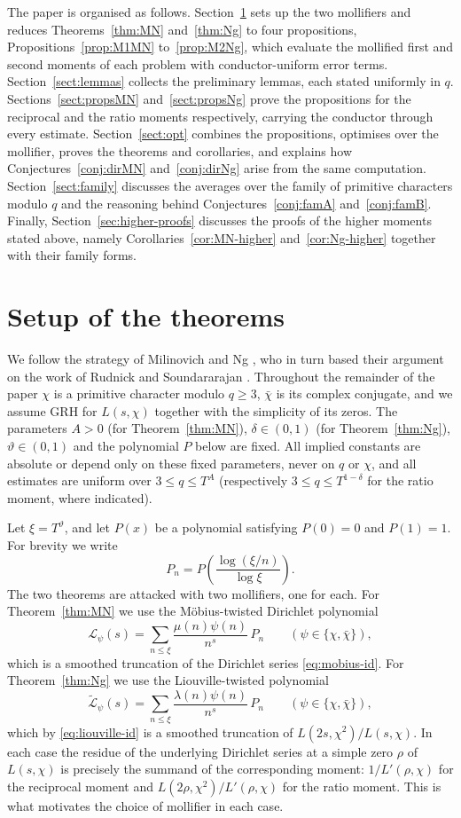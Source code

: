\documentclass[12pt,a4paper,reqno]{amsart}
\theoremstyle{remark}
\numberwithin{equation}{section}
\begin{document}
The paper is organised as follows. Section~\ref{sect:setup} sets up the two mollifiers and reduces Theorems~\ref{thm:MN} and~\ref{thm:Ng} to four propositions, Propositions~\ref{prop:M1MN} to~\ref{prop:M2Ng}, which evaluate the mollified first and second moments of each problem with conductor-uniform error terms. Section~\ref{sect:lemmas} collects the preliminary lemmas, each stated uniformly in $q$. Sections~\ref{sect:propsMN} and~\ref{sect:propsNg} prove the propositions for the reciprocal and the ratio moments respectively, carrying the conductor through every estimate. Section~\ref{sect:opt} combines the propositions, optimises over the mollifier, proves the theorems and corollaries, and explains how Conjectures~\ref{conj:dirMN} and~\ref{conj:dirNg} arise from the same computation. Section~\ref{sect:family} discusses the averages over the family of primitive characters modulo $q$ and the reasoning behind Conjectures~\ref{conj:famA} and~\ref{conj:famB}. Finally, Section~\ref{sec:higher-proofs} discusses the proofs of the higher moments stated above, namely Corollaries~\ref{cor:MN-higher} and~\ref{cor:Ng-higher} together with their family forms.

\section{Setup of the theorems}\label{sect:setup}

We follow the strategy of Milinovich and Ng \cite{MilinovichNg}, who in turn based their argument on the work of Rudnick and Soundararajan \cite{RudnickSound}. Throughout the remainder of the paper $\chi$ is a primitive character modulo $q\ge3$, $\bar\chi$ is its complex conjugate, and we assume GRH for $L(s,\chi)$ together with the simplicity of its zeros. The parameters $A>0$ (for Theorem~\ref{thm:MN}), $\delta\in(0,1)$ (for Theorem~\ref{thm:Ng}), $\vartheta\in(0,1)$ and the polynomial $P$ below are fixed. All implied constants are absolute or depend only on these fixed parameters, never on $q$ or $\chi$, and all estimates are uniform over $3\le q\le T^{A}$ (respectively $3\le q\le T^{1-\delta}$ for the ratio moment, where indicated).

Let $\xi=T^{\vartheta}$, and let $P(x)$ be a polynomial satisfying $P(0)=0$ and $P(1)=1$. For brevity we write
\[
P_n=P\!\left(\frac{\log(\xi/n)}{\log\xi}\right).
\]
The two theorems are attacked with two mollifiers, one for each. For Theorem~\ref{thm:MN} we use the M\"obius-twisted Dirichlet polynomial
\[
\mathcal{L}_{\psi}(s)=\sum_{n\le\xi}\frac{\mu(n)\psi(n)}{n^{s}}\,P_n
\qquad(\psi\in\{\chi,\bar\chi\}),
\]
which is a smoothed truncation of the Dirichlet series \eqref{eq:mobius-id}. For Theorem~\ref{thm:Ng} we use the Liouville-twisted polynomial
\[
\widetilde{\mathcal{L}}_{\psi}(s)=\sum_{n\le\xi}\frac{\lambda(n)\psi(n)}{n^{s}}\,P_n
\qquad(\psi\in\{\chi,\bar\chi\}),
\]
which by \eqref{eq:liouville-id} is a smoothed truncation of $L(2s,\chi^2)/L(s,\chi)$. In each case the residue of the underlying Dirichlet series at a simple zero $\rho$ of $L(s,\chi)$ is precisely the summand of the corresponding moment: $1/L'(\rho,\chi)$ for the reciprocal moment and $L(2\rho,\chi^2)/L'(\rho,\chi)$ for the ratio moment. This is what motivates the choice of mollifier in each case.
\end{document}
